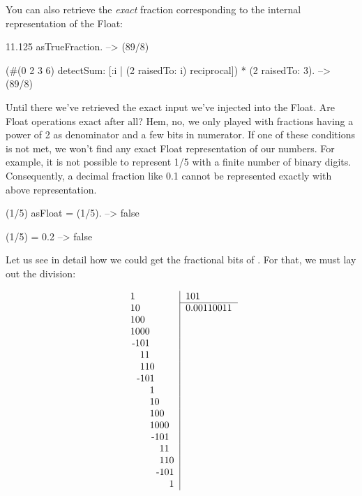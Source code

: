 \documentclass[a4paper,10pt,twoside]{book}
\begin{document}
You can also retrieve the \emph{exact} fraction corresponding to the internal representation of the Float:
 \begin{code}{}
 11.125 asTrueFraction.
	-->  (89/8)

(#(0 2 3 6) detectSum: [:i | (2 raisedTo: i) reciprocal]) * (2 raisedTo: 3).
	-->  (89/8)
\end{code}

Until there we've retrieved the exact input we've injected into the Float. Are Float operations exact after all? Hem, no, we only played with fractions having a power of 2 as denominator and a few bits in numerator. If one of these conditions is not met, we won't find any exact Float representation of our numbers. For example, it is not possible to represent 1/5 with a finite number of binary digits. Consequently, a decimal fraction like 0.1 cannot be represented exactly with above representation.
 \begin{code}{}
(1/5) asFloat = (1/5).
	--> false
	
(1/5) = 0.2
	--> false
\end{code}

Let us see in detail how we could get the fractional bits of  \ie \mbox{}. For that, we must lay out the division:

\[
\begin{tabular}{r|l}
\multicolumn{1}{r|}{1\phantom{00000000}} & 101 \\  \cline{2-2}
10\phantom{0000000} & 0.00110011 \\ 
100\phantom{000000}  & \\
1000\phantom{00000}  & \\
-101\phantom{00000}  & \\
   11\phantom{00000}  & \\
   110\phantom{0000} & \\
  -101\phantom{0000} & \\
        1\phantom{0000} & \\
        10\phantom{000} & \\
        100\phantom{00} & \\
        1000\phantom{0} & \\
         -101\phantom{0} & \\
             11\phantom{0} & \\
             110 & \\
            -101 & \\
                  1 & \\
\end{tabular} 
 \]
\end{document}
